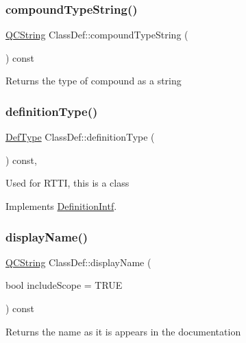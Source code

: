 \subsubsection{\texorpdfstring{compoundTypeString()}{compoundTypeString()}}
{\footnotesize\ttfamily \mbox{\hyperlink{class_q_c_string}{Q\+C\+String}} Class\+Def\+::compound\+Type\+String (\begin{DoxyParamCaption}{ }\end{DoxyParamCaption}) const}

Returns the type of compound as a string \mbox{\label{class_class_def_ab84f56a99816a73920785d48a059c769}} 
\subsubsection{\texorpdfstring{definitionType()}{definitionType()}}
{\footnotesize\ttfamily \mbox{\hyperlink{class_definition_intf_ada60114bc621669dd8c19edfc6421766}{Def\+Type}} Class\+Def\+::definition\+Type (\begin{DoxyParamCaption}{ }\end{DoxyParamCaption}) const\hspace{0.3cm}{\ttfamily [inline]}, {\ttfamily [virtual]}}

Used for R\+T\+TI, this is a class 

Implements \mbox{\hyperlink{class_definition_intf_ac8ee00bc1af5558ae37f6896d16f5a3a}{Definition\+Intf}}.

\mbox{\label{class_class_def_aa891187c2712372f19ee6c202df24fec}} 
\subsubsection{\texorpdfstring{displayName()}{displayName()}}
{\footnotesize\ttfamily \mbox{\hyperlink{class_q_c_string}{Q\+C\+String}} Class\+Def\+::display\+Name (\begin{DoxyParamCaption}\item[{bool}]{include\+Scope = {\ttfamily TRUE} }\end{DoxyParamCaption}) const\hspace{0.3cm}{\ttfamily [virtual]}}

Returns the name as it is appears in the documentation 

